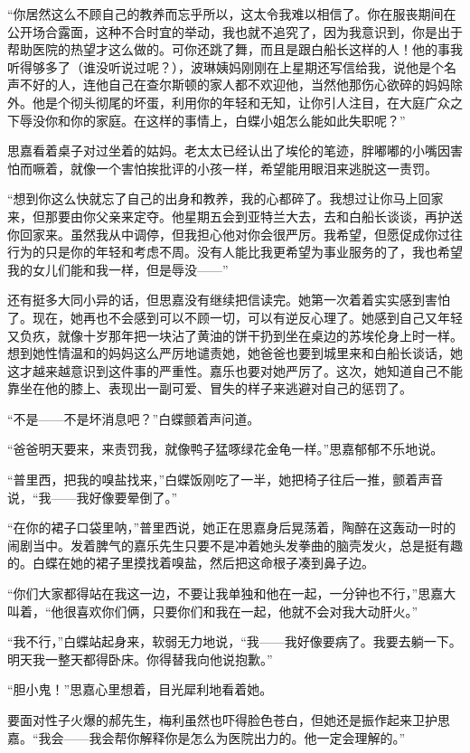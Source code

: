 \par “你居然这么不顾自己的教养而忘乎所以，这太令我难以相信了。你在服丧期间在公开场合露面，这种不合时宜的举动，我也就不追究了，因为我意识到，你是出于帮助医院的热望才这么做的。可你还跳了舞，而且是跟白船长这样的人！他的事我听得够多了（谁没听说过呢？），波琳姨妈刚刚在上星期还写信给我，说他是个名声不好的人，连他自己在查尔斯顿的家人都不欢迎他，当然他那伤心欲碎的妈妈除外。他是个彻头彻尾的坏蛋，利用你的年轻和无知，让你引人注目，在大庭广众之下辱没你和你的家庭。在这样的事情上，白蝶小姐怎么能如此失职呢？”
\par 思嘉看着桌子对过坐着的姑妈。老太太已经认出了埃伦的笔迹，胖嘟嘟的小嘴因害怕而噘着，就像一个害怕挨批评的小孩一样，希望能用眼泪来逃脱这一责罚。
\par “想到你这么快就忘了自己的出身和教养，我的心都碎了。我想过让你马上回家来，但那要由你父亲来定夺。他星期五会到亚特兰大去，去和白船长谈谈，再护送你回家来。虽然我从中调停，但我担心他对你会很严厉。我希望，但愿促成你过往行为的只是你的年轻和考虑不周。没有人能比我更希望为事业服务的了，我也希望我的女儿们能和我一样，但是辱没——”
\par 还有挺多大同小异的话，但思嘉没有继续把信读完。她第一次着着实实感到害怕了。现在，她再也不会感到可以不顾一切，可以有逆反心理了。她感到自己又年轻又负疚，就像十岁那年把一块沾了黄油的饼干扔到坐在桌边的苏埃伦身上时一样。想到她性情温和的妈妈这么严厉地谴责她，她爸爸也要到城里来和白船长谈话，她这才越来越意识到这件事的严重性。嘉乐也要对她严厉了。这次，她知道自己不能靠坐在他的膝上、表现出一副可爱、冒失的样子来逃避对自己的惩罚了。
\par “不是——不是坏消息吧？”白蝶颤着声问道。
\par “爸爸明天要来，来责罚我，就像鸭子猛啄绿花金龟一样。”思嘉郁郁不乐地说。
\par “普里西，把我的嗅盐找来，”白蝶饭刚吃了一半，她把椅子往后一推，颤着声音说，“我——我好像要晕倒了。”
\par “在你的裙子口袋里呐，”普里西说，她正在思嘉身后晃荡着，陶醉在这轰动一时的闹剧当中。发着脾气的嘉乐先生只要不是冲着她头发拳曲的脑壳发火，总是挺有趣的。白蝶在她的裙子里摸找着嗅盐，然后把这命根子凑到鼻子边。
\par “你们大家都得站在我这一边，不要让我单独和他在一起，一分钟也不行，”思嘉大叫着，“他很喜欢你们俩，只要你们和我在一起，他就不会对我大动肝火。”
\par “我不行，”白蝶站起身来，软弱无力地说，“我——我好像要病了。我要去躺一下。明天我一整天都得卧床。你得替我向他说抱歉。”
\par “胆小鬼！”思嘉心里想着，目光犀利地看着她。
\par 要面对性子火爆的郝先生，梅利虽然也吓得脸色苍白，但她还是振作起来卫护思嘉。“我会——我会帮你解释你是怎么为医院出力的。他一定会理解的。”
